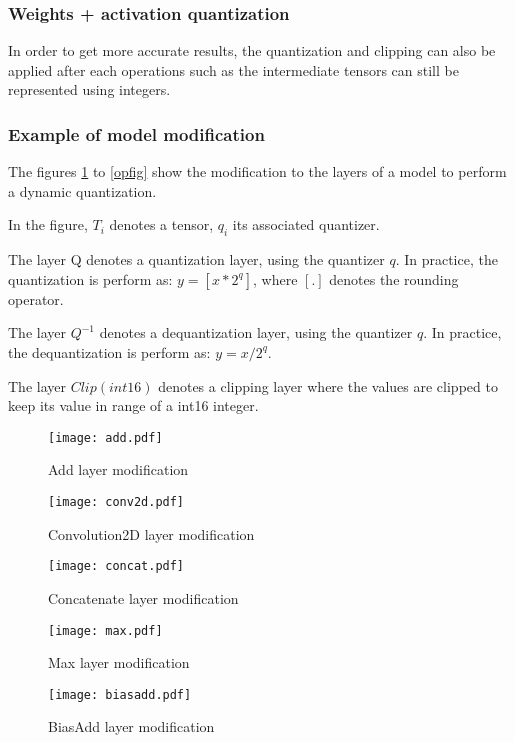 \documentclass[10pt,a4paper]{article}
\begin{document}
\subsubsection{Weights + activation quantization}
In order to get more accurate results, the quantization and clipping can also be applied after each operations such as the intermediate tensors can still be represented using integers.

\subsubsection{Example of model modification}
The figures \ref{addfig} to \ref{opfig} show the modification to the layers of a model to perform a dynamic quantization.

In the figure, $T_i$ denotes a tensor, $q_i$ its associated quantizer. 

The layer Q denotes a quantization layer, using the quantizer $q$. In practice, the quantization is perform as: $y=\left[ x * 2^q \right] $, where $ \left[ . \right]$ denotes the rounding operator.

The layer $Q^{-1}$ denotes a dequantization layer, using the quantizer $q$. In practice, the dequantization is perform as: $y=x / 2^q $.

The layer $Clip(int16)$ denotes a clipping layer where the values are clipped to keep its value in range of a int16 integer.


\begin{figure}[p]
\texttt{[image: add.pdf]}
\caption{Add layer modification}\label{addfig}
\end{figure}

\begin{figure}[p]
\texttt{[image: conv2d.pdf]}
\caption{Convolution2D layer modification}
\end{figure}

\begin{figure}[p]
\texttt{[image: concat.pdf]}
\caption{Concatenate layer modification}
\end{figure}

\begin{figure}[p]
\texttt{[image: max.pdf]}
\caption{Max layer modification}
\end{figure}

\begin{figure}[p]
\texttt{[image: biasadd.pdf]}
\caption{BiasAdd layer modification}
\end{figure}
\end{document}
